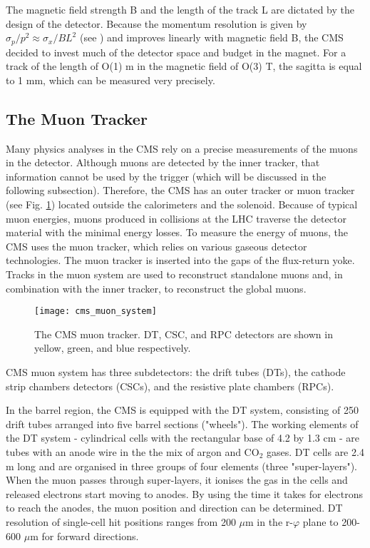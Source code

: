 \begin{normalsize}
The magnetic field strength B and the length of the track L are dictated by the design of the detector. Because the momentum resolution is given by $\sigma_p / p^2 \approx \sigma_x / B L^2 $ (see \cite {Hauptman:2011zza}) and improves linearly with magnetic field B, the CMS decided to invest much of the detector space and budget in the magnet. For a track of the length of O(1) m in the magnetic field of O(3) T, the sagitta is equal to 1 mm, which can be measured very precisely. 



\subsection{The Muon Tracker}

Many physics analyses in the CMS rely on a precise measurements of the muons in the detector. Although muons are detected by the inner tracker, that information cannot be used by the trigger (which will be discussed in the following subsection). Therefore, the CMS has an outer tracker or muon tracker \cite{Muon_system_TDR} (see Fig. \ref{cms_muon_system}) located outside the calorimeters and the solenoid. Because of typical muon energies, muons produced in collisions at the LHC traverse the detector material with the minimal energy losses. To measure the energy of muons, the CMS uses the muon tracker, which relies on various gaseous detector technologies. The muon tracker is inserted into the gaps of the flux-return yoke. Tracks in the muon system are used to reconstruct standalone muons and, in combination with the inner tracker, to reconstruct the global muons.



 \begin{figure}[H]
  \centering
  \texttt{[image: cms\_muon\_system]}
  \caption[The CMS muon tracker]{The CMS muon tracker. DT, CSC, and RPC detectors are shown in yellow, green, and blue respectively.}
  \label{cms_muon_system}
\end{figure}

CMS muon system has three subdetectors: the drift tubes (DTs), the cathode strip chambers detectors (CSCs), and the resistive plate chambers (RPCs). 

In the barrel region, the CMS is equipped with the DT system, consisting of 250 drift tubes arranged into five barrel sections ("wheels"). The working elements of the DT system - cylindrical cells with the rectangular base of 4.2 by 1.3 cm - are tubes with an anode wire in the the mix of argon and CO$_2$ gases. DT cells are 2.4 m long and are organised in three groups of four elements (three "super-layers"). When the muon passes through super-layers, it ionises the gas in the cells and released electrons start moving to anodes. By using the time it takes for electrons to reach the anodes, the muon position and direction can be determined. DT resolution of single-cell hit positions ranges from 200 $\mu$m in the r-$\varphi$ plane to 200-600 $\mu$m for forward directions. 


\end{normalsize}
